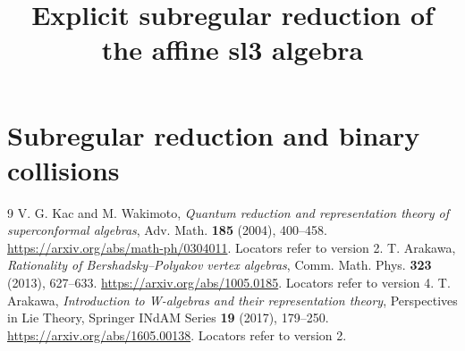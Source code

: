 \documentclass[11pt,oneside]{memoir}
\title{Explicit subregular reduction of the affine sl3 algebra}
\author{}\date{}
\begin{document}
\chapter{Subregular reduction and binary collisions}


\begin{thebibliography}{9}
 V. G. Kac and M. Wakimoto, \emph{Quantum reduction and representation theory of superconformal algebras}, Adv. Math. \textbf{185} (2004), 400--458. \url{https://arxiv.org/abs/math-ph/0304011}. Locators refer to version 2.
 T. Arakawa, \emph{Rationality of Bershadsky--Polyakov vertex algebras}, Comm. Math. Phys. \textbf{323} (2013), 627--633. \url{https://arxiv.org/abs/1005.0185}. Locators refer to version 4.
 T. Arakawa, \emph{Introduction to W-algebras and their representation theory}, Perspectives in Lie Theory, Springer INdAM Series \textbf{19} (2017), 179--250. \url{https://arxiv.org/abs/1605.00138}. Locators refer to version 2.
\end{thebibliography}
\end{document}
